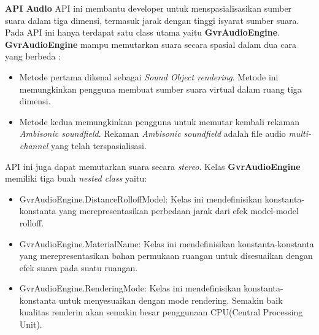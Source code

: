 \documentclass[a4paper,twoside]{article}
\begin{document}
\begin{enumerate}
\textbf{API Audio}
\label{sec:api_audio}
\cite{google_vr_developers}
API ini membantu developer untuk menspasialisasikan sumber suara dalam tiga dimensi, termasuk jarak dengan tinggi isyarat sumber suara. Pada API ini hanya terdapat satu class utama yaitu \textbf{GvrAudioEngine}. \textbf{GvrAudioEngine} mampu memutarkan suara secara spasial dalam dua cara yang berbeda :
\begin{itemize}
	\item Metode pertama dikenal sebagai \textit{Sound Object rendering}. Metode ini memungkinkan pengguna membuat sumber suara virtual dalam ruang tiga dimensi.
	\item Metode kedua memungkinkan pengguna untuk memutar kembali rekaman \textit{Ambisonic soundfield}. Rekaman \textit{Ambisonic soundfield} adalah file audio \textit{multi-channel} yang telah terspasialisasi.
\end{itemize}
API ini juga dapat memutarkan suara secara \textit{stereo}. Kelas \textbf{GvrAudioEngine} memiliki tiga buah \textit{nested class} yaitu:
\begin{itemize}
	\item GvrAudioEngine.DistanceRolloffModel: Kelas ini mendefinisikan konstanta-konstanta yang merepresentasikan perbedaan jarak dari efek model-model rolloff. 
	\item GvrAudioEngine.MaterialName: Kelas ini mendefinisikan konstanta-konstanta yang merepresentasikan bahan permukaan ruangan untuk disesuaikan dengan efek suara pada suatu ruangan.
	\item GvrAudioEngine.RenderingMode: Kelas ini mendefinisikan konstanta-konstanta untuk menyesuaikan dengan mode rendering. Semakin baik kualitas renderin akan semakin besar penggunaan CPU(Central Processing Unit).
\end{itemize}


\end{enumerate}
\end{document}
